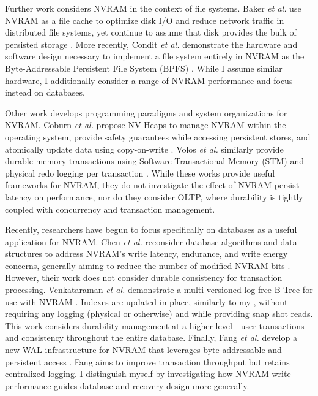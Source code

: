 Further work considers NVRAM in the context of file systems.
Baker \emph{et al.} use NVRAM as a file cache to optimize disk I/O and reduce network traffic in distributed file systems, yet continue to assume that disk provides the bulk of persisted storage \cite{BakerAsami92}.
More recently, Condit \emph{et al.} demonstrate the hardware and software design necessary to implement a file system entirely in NVRAM as the Byte-Addressable Persistent File System (BPFS) \cite{ConditNightingale09}.
While I assume similar hardware, I additionally consider a range of NVRAM performance and focus instead on databases.

Other work develops programming paradigms and system organizations for NVRAM.
Coburn \emph{et al.} propose NV-Heaps to manage NVRAM within the operating system, provide safety guarantees while accessing persistent stores, and atomically update data using copy-on-write \cite{CoburnCaulfield11}.
Volos \emph{et al.} similarly provide durable memory transactions using Software Transactional Memory (STM) and physical redo logging per transaction \cite{VolosTack11}.
While these works provide useful frameworks for NVRAM, they do not investigate the effect of NVRAM persist latency on performance, nor do they consider OLTP, where durability is tightly coupled with concurrency and transaction management.

Recently, researchers have begun to focus specifically on databases as a useful application for NVRAM.
Chen \emph{et al.} reconsider database algorithms and data structures to address NVRAM's write latency, endurance, and write energy concerns, generally aiming to reduce the number of modified NVRAM bits \cite{ChenGibbons11}.
However, their work does not consider durable consistency for transaction processing.
Venkataraman \emph{et al.} demonstrate a multi-versioned log-free B-Tree for use with NVRAM \cite{VenkataramanTolia11}.
Indexes are updated in place, similarly to my \InPlace, without requiring any logging (physical or otherwise) and while providing snap shot reads.
This work considers durability management at a higher level---user transactions---and consistency throughout the entire database.
Finally, Fang \emph{et al.} develop a new WAL infrastructure for NVRAM that leverages byte addressable and persistent access \cite{FangHsiao11}.
Fang aims to improve transaction throughput but retains centralized logging.
I distinguish myself by investigating how NVRAM write performance guides database and recovery design more generally.

